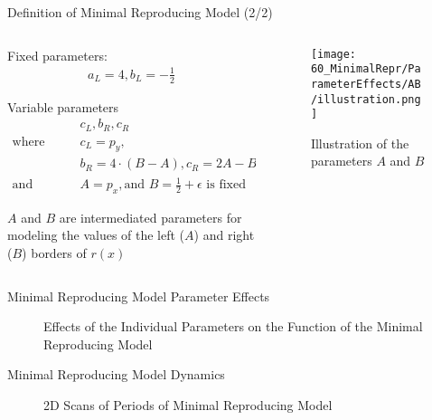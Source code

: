 \begin{frame}{Definition of Minimal Reproducing Model (2/2)}
	\begin{columns}
		\begin{column}{.7 \textwidth}
			Fixed parameters:
			\begin{align*}
				a_L = 4, b_L = -\frac{1}{2}
			\end{align*}

			Variable parameters
			\begin{align*}
				 & c_L, b_R, c_R                                                    \\
				\text{where} \qquad
				 & c_L = p_y,                                                       \\
				 & b_R = 4 \cdot (B - A), c_R = 2A - B                              \\
				\text {and} \qquad
				 & A = p_x, \text{and } B = \frac{1}{2} + \epsilon \text{ is fixed}
			\end{align*}

			$A$ and $B$ are intermediated parameters for modeling the values of the left ($A$) and right ($B$) borders of $r(x)$
		\end{column}
		\begin{column}{.3 \textwidth}
			\begin{figure}
				\centering
				\texttt{[image: 60\_MinimalRepr/ParameterEffects/AB/illustration.png]}
				\caption{Illustration of the parameters $A$ and $B$}
			\end{figure}
		\end{column}
	\end{columns}
\end{frame}

\begin{frame}{Minimal Reproducing Model Parameter Effects}
	\vspace{-1.0em}
	\begin{figure}
		\centering
		\caption{Effects of the Individual Parameters on the Function of the Minimal Reproducing Model}
	\end{figure}
\end{frame}

\begin{frame}{Minimal Reproducing Model Dynamics}
	\vspace{-1.0em}
	\begin{figure}
		\centering
		\caption{2D Scans of Periods of Minimal Reproducing Model}
	\end{figure}
\end{frame}

